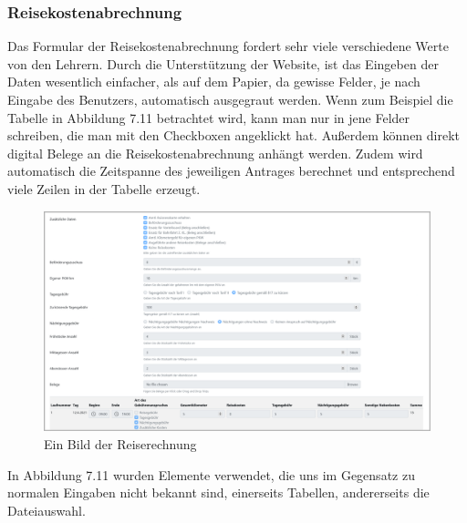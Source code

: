 \subsubsection{Reisekostenabrechnung}
\label{chapter:implementierung-frontend-komponenten-rechnung}
Das Formular der Reisekostenabrechnung fordert sehr viele verschiedene Werte von den Lehrern. Durch die Unterstützung der Website, ist das Eingeben der Daten wesentlich einfacher, als auf dem Papier, da gewisse Felder, je nach Eingabe des Benutzers, automatisch ausgegraut werden. Wenn zum Beispiel die Tabelle in Abbildung 7.11 betrachtet wird, kann man nur in jene Felder schreiben, die man mit den Checkboxen angeklickt hat. Außerdem können direkt digital Belege an die Reisekostenabrechnung anhängt werden. Zudem wird automatisch die Zeitspanne des jeweiligen Antrages berechnet und entsprechend viele Zeilen in der Tabelle erzeugt.
\begin{figure}[H]
	\centering
	\includegraphics[width=1\linewidth]{images/website/reiserechnung_1}
	\caption[Neuer Schulantrag]{Ein Bild der Reiserechnung}
	\label{fig:reiserechnungsite}
\end{figure}
In Abbildung 7.11 wurden Elemente verwendet, die uns im Gegensatz zu normalen Eingaben nicht bekannt sind, einerseits Tabellen, andererseits die Dateiauswahl.
